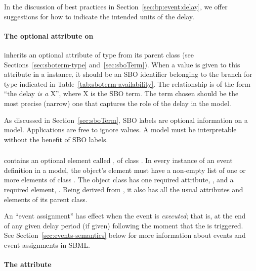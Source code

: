 In the discussion of best practices in
Section~\ref{sec:bp:event:delay}, we offer suggestions for how to
indicate the intended units of the delay.


\paragraph{The optional  attribute on }
\label{sec:delay-sboterm}

\Delay  inherits an optional 
attribute of type  from its parent
class \SBase (see Sections~\ref{sec:sboterm-type}
and~\ref{sec:sboTerm}).  When a value is given to this
attribute in a  \Delay instance, it should be an
SBO identifier belonging to the branch for type  \Delay
indicated in Table~\ref{tab:sboterm-availability}.  The relationship is
of the form ``the delay \emph{is a} X'', where X is
the SBO term.  The term chosen should be the most precise (narrow)
one that captures the role of the delay  in the model.

As discussed in Section~\ref{sec:sboTerm}, SBO labels are optional
information on a model.  Applications are free to ignore
 values.  A model must be interpretable without the
benefit of SBO labels.



\subsubsection{}
\label{sec:eventassignment}
\label{sec:listofeventassignments}

\Event contains an optional element called
, of class \ListOfEventAssignments.
In every instance of an event definition in a model, the object's
 element must have a non-empty list
of one or more  elements of class
\EventAssignment.  The object class \EventAssignment has one
required attribute, , and a required element,
.  Being derived from \SBase, it also has all the
usual attributes and elements of its parent class.

An ``event assignment'' has effect when the event is
\emph{executed}; that is, at the end of any given delay period (if
given) following the moment that the \Event is triggered.  See
Section~\ref{sec:events-semantics} below for more information
about events and event assignments in SBML.


\paragraph{The  attribute}

